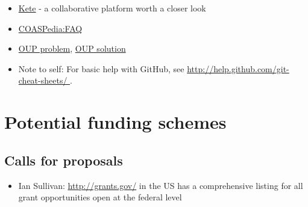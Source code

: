 \documentclass[final,authoryear,3p]{elsarticle-open-drafting}
\begin{document}
\begin{itemize}
	\item \href{http://kete.net.nz/}{Kete} - a collaborative platform worth a closer look
	\item \href{http://www.science3point0.com/coaspedia/index.php/COASPedia:FAQ}{COASPedia:FAQ}
	\item \href{http://www.timeshighereducation.co.uk/story.asp?sectioncode=26&storycode=416531&c=2}{OUP problem}, \href{http://www.timeshighereducation.co.uk/story.asp?storycode=416608}{OUP solution}
	\item Note to self: For basic help with GitHub, see \href{http://help.github.com/git-cheat-sheets/}{http://help.github.com/git-cheat-sheets/ } .
\end{itemize}


\section{Potential funding schemes}
\subsection{Calls for proposals}
\begin{itemize}
	\item Ian Sullivan: \href{http://grants.gov/}{http://grants.gov/}  in the US has a comprehensive listing for all grant opportunities open at the federal level
\end{itemize}
\end{document}
